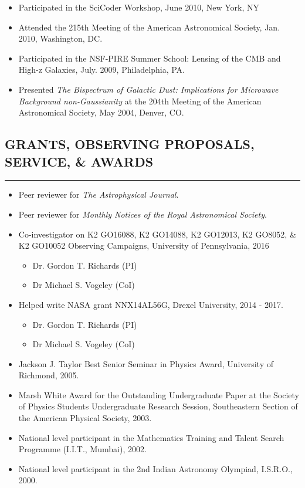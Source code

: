 \documentclass[10pt,a4]{article}
\newcounter{mySaveCounter}
\newcommand\myEnumReset{\setcounter{mySaveCounter}{0}}
\begin{document}
\begin{itemize}
    \item Participated in the SciCoder Workshop, June 2010, New York, NY
    \item Attended the 215th Meeting of the American Astronomical Society, Jan. 2010, Washington, DC.
    \item Participated in the NSF-PIRE Summer School: Lensing of the CMB and High-z Galaxies, July. 2009, Philadelphia, PA.
    \item  Presented {\it The Bispectrum of Galactic Dust: Implications for Microwave Background non-Gaussianity} at the 204th Meeting of the American Astronomical Society, May 2004, Denver, CO.
\end{itemize}
\myEnumReset

\subsection*{GRANTS, OBSERVING PROPOSALS, SERVICE, \& AWARDS}
\hrule  height 4pt
\vspace{0.2cm}
\begin{itemize}
  \item Peer reviewer for {\it The Astrophysical Journal}.
  \item Peer reviewer for {\it Monthly Notices of the Royal Astronomical Society}.
  \item Co-investigator on K2 GO16088, K2 GO14088, K2 GO12013, K2 GO8052, \& K2 GO10052 Observing Campaigns, University of Pennsylvania, 2016
    \begin{itemize}
      \item Dr. Gordon T. Richards (PI)
      \item Dr Michael S. Vogeley (CoI)
    \end{itemize}
  \item Helped write NASA grant NNX14AL56G, Drexel University, 2014 - 2017.
    \begin{itemize}
      \item Dr. Gordon T. Richards (PI)
      \item Dr Michael S. Vogeley (CoI)
    \end{itemize}
	\item Jackson J. Taylor Best Senior Seminar in Physics Award, University of Richmond, 2005.
  \item Marsh White Award for the Outstanding Undergraduate Paper at the Society of Physics Students Undergraduate Research Session, Southeastern Section of the American Physical Society, 2003.
	\item National level participant in the Mathematics Training and Talent Search Programme (I.I.T., Mumbai), 2002.
	\item National level participant in the 2nd Indian Astronomy Olympiad, I.S.R.O., 2000.
\end{itemize}
\myEnumReset
\end{document}
